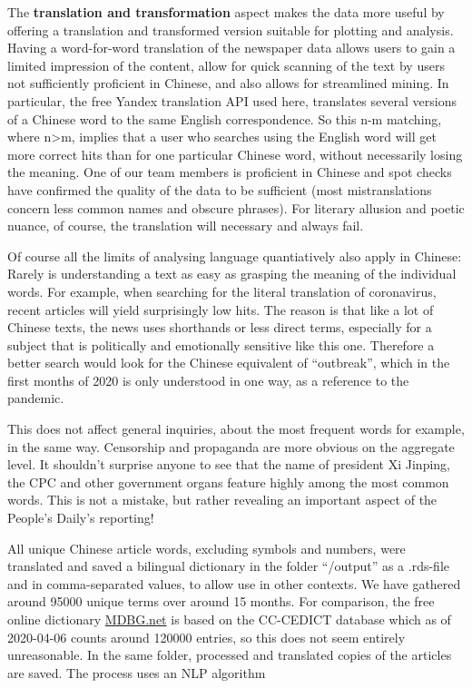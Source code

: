 \documentclass[12pt,a4paper]{article}
\begin{document}
The \textbf{translation and transformation} aspect makes the data more
useful by offering a translation and transformed version suitable for
plotting and analysis. Having a word-for-word translation of the
newspaper data allows users to gain a limited impression of the content,
allow for quick scanning of the text by users not sufficiently
proficient in Chinese, and also allows for streamlined mining. In
particular, the free Yandex translation API used here, translates
several versions of a Chinese word to the same English correspondence.
So this n-m matching, where n\textgreater m, implies that a user who
searches using the English word will get more correct hits than for one
particular Chinese word, without necessarily losing the meaning. One of
our team members is proficient in Chinese and spot checks have confirmed
the quality of the data to be sufficient (most mistranslations concern
less common names and obscure phrases). For literary allusion and poetic
nuance, of course, the translation will necessary and always fail.

Of course all the limits of analysing language quantiatively also apply
in Chinese: Rarely is understanding a text as easy as grasping the
meaning of the individual words. For example, when searching for the
literal translation of coronavirus, recent articles will yield
surprisingly low hits. The reason is that like a lot of Chinese texts,
the news uses shorthands or less direct terms, especially for a subject
that is politically and emotionally sensitive like this one. Therefore a
better search would look for the Chinese equivalent of
\enquote{outbreak}, which in the first months of 2020 is only understood
in one way, as a reference to the pandemic.

This does not affect general inquiries, about the most frequent words
for example, in the same way. Censorship and propaganda are more obvious
on the aggregate level. It shouldn't surprise anyone to see that the
name of president Xi Jinping, the CPC and other government organs
feature highly among the most common words. This is not a mistake, but
rather revealing an important aspect of the People's Daily's reporting!

All unique Chinese article words, excluding symbols and numbers, were
translated and saved a bilingual dictionary in the folder
\enquote{/output} as a .rds-file and in comma-separated values, to allow
use in other contexts. We have gathered around 95000 unique terms over
around 15 months. For comparison, the free online dictionary
\href{https://www.mdbg.net/chinese/dictionary?page=cedict}{MDBG.net} is
based on the CC-CEDICT database which as of 2020-04-06 counts around
120000 entries, so this does not seem entirely unreasonable. In the same
folder, processed and translated copies of the articles are saved. The
process uses an NLP algorithm
\end{document}
